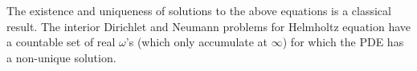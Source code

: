 \begin{remark}
The existence and uniqueness of solutions to the above equations is a classical result. 
The interior Dirichlet and Neumann problems for Helmholtz equation have a countable set of
real $\omega$'s (which only accumulate at $\infty$)  for which the PDE has a non-unique solution. 
\end{remark}
